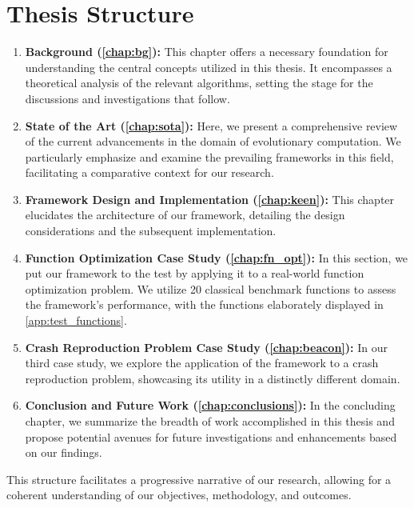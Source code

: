 \section{Thesis Structure}
\label{sec:structure}

  \begin{enumerate}
    \item \textbf{Background (\vref{chap:bg}):} This chapter offers a necessary 
      foundation for understanding the central concepts utilized in this thesis.
      It encompasses a theoretical analysis of the relevant algorithms, setting 
      the stage for the discussions and investigations that follow.
    \item \textbf{State of the Art (\vref{chap:sota}):} Here, we present a 
      comprehensive review of the current advancements in the domain of 
      evolutionary computation.
      We particularly emphasize and examine the prevailing frameworks in this 
      field, facilitating a comparative context for our research.
    \item \textbf{Framework Design and Implementation (\vref{chap:keen}):} This 
      chapter elucidates the architecture of our framework, detailing the
      design considerations and the subsequent implementation.
    \item \textbf{Function Optimization Case Study (\vref{chap:fn_opt}):} In 
      this section, we put our framework to the test by applying it to a 
      real-world function optimization problem.
      We utilize 20 classical benchmark functions to assess the framework's 
      performance, with the functions elaborately displayed in 
      \vref{app:test_functions}.
    \item \textbf{Crash Reproduction Problem Case Study (\vref{chap:beacon}):} 
      In our third case study, we explore the application of the framework to a 
      crash reproduction problem, showcasing its utility in a distinctly 
      different domain.
    \item \textbf{Conclusion and Future Work (\vref{chap:conclusions}):} In the 
      concluding chapter, we summarize the breadth of work accomplished in this 
      thesis and propose potential avenues for future investigations and 
      enhancements based on our findings.
  \end{enumerate}

  This structure facilitates a progressive narrative of our research, allowing 
  for a coherent understanding of our objectives, methodology, and outcomes.
